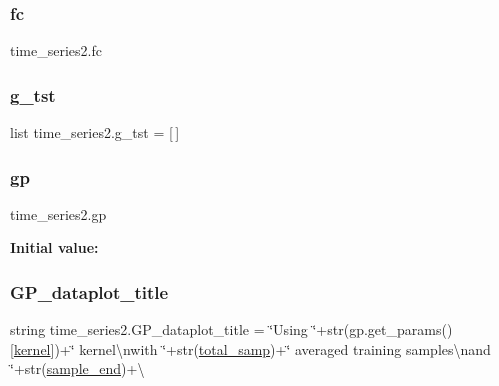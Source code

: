 \subsubsection{\texorpdfstring{fc}{fc}}
{\footnotesize\ttfamily time\+\_\+series2.\+fc}

\mbox{\label{namespacetime__series2_a8ae6164c022bbafc01611a6801bc0f61}} 
\subsubsection{\texorpdfstring{g\+\_\+tst}{g\_tst}}
{\footnotesize\ttfamily list time\+\_\+series2.\+g\+\_\+tst = \mbox{[}$\,$\mbox{]}}

\mbox{\label{namespacetime__series2_abd0932f2ea87fc90f945a626050ecc14}} 
\subsubsection{\texorpdfstring{gp}{gp}}
{\footnotesize\ttfamily time\+\_\+series2.\+gp}

{\bfseries Initial value\+:}
\begin{DoxyCode}
\end{DoxyCode}
\mbox{\label{namespacetime__series2_abbce76511798b545cbd2d31ff635e1e0}} 
\subsubsection{\texorpdfstring{G\+P\+\_\+dataplot\+\_\+title}{GP\_dataplot\_title}}
{\footnotesize\ttfamily string time\+\_\+series2.\+G\+P\+\_\+dataplot\+\_\+title = \char`\"{}Using \char`\"{}+str(gp.\+get\+\_\+params()\mbox{[}\textquotesingle{}\mbox{\hyperlink{namespacetime__series2_a79d2d803d9f27eb4ed08932199d79a23}{kernel}}\textquotesingle{}\mbox{]})+\char`\"{} kernel\textbackslash{}nwith \char`\"{}+str(\mbox{\hyperlink{namespacetime__series2_af8e48fc6d3d4ad2c551a1b3df864aa51}{total\+\_\+samp}})+\char`\"{} averaged training samples\textbackslash{}nand \char`\"{}+str(\mbox{\hyperlink{namespacetime__series2_ad170197f80cacfa1a597f0cc81af1ed5}{sample\+\_\+end}})+\textbackslash{}}

